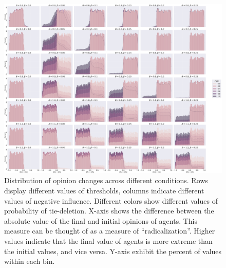 \documentclass{article}
\begin{document}
\begin{figure}[H]
    \centering
    \includegraphics[width=.8\linewidth]{../plots/overall/Radicalization.png}
  \caption{Distribution of opinion changes across different conditions. Rows display different values of thresholds, columns indicate different values of negative influence. Different colors show different values of probability of tie-deletion. X-axis shows the difference between the absolute value of the final and initial opinions of agents. This measure can be thought of as a measure of “radicalization”. Higher values indicate that the final value of agents is more extreme than the initial values, and vice versa. Y-axis exhibit the percent of values within each bin. }
  \label{fig:radicalization}
\end{figure}
\end{document}
